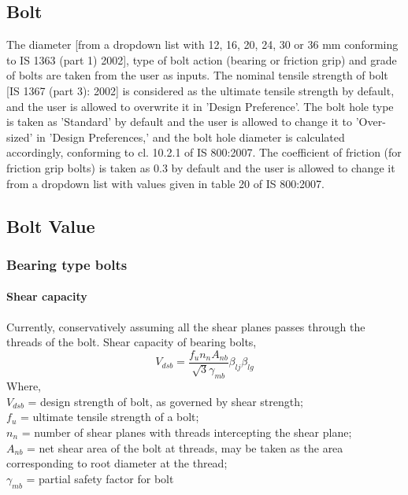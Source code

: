 \documentclass[11.5pt,a4paper,oneside]{report}
\begin{document}
\begin{Form}
\chapter{Bolt}
%
The diameter [from a dropdown list with 12, 16, 20, 24, 30 or 36 mm conforming to IS 1363 (part 1) 2002], type of bolt action (bearing or friction grip) and grade of bolts are taken from the user as inputs. The nominal tensile strength of bolt [IS 1367 (part 3): 2002] is considered as the ultimate tensile strength by default, and the user is allowed to overwrite it in 'Design Preference'. The bolt hole type is taken as 'Standard' by default and the user is allowed to change it to 'Over-sized' in 'Design Preferences,' and the bolt hole diameter is calculated accordingly, conforming to cl. 10.2.1 of IS 800:2007. The coefficient of friction (for friction grip bolts) is taken as 0.3 by default and the user is allowed to change it from a dropdown list with values given in table 20 of IS 800:2007. 
\section{Bolt Value}
\subsection{Bearing type bolts}
\subsubsection{Shear capacity}
Currently, conservatively assuming all the shear planes passes through the threads of the bolt. Shear capacity of bearing bolts,
\begin{equation}
	V_{dsb} = \frac{f_u n_n A_{nb}}{\sqrt{3} \gamma_{mb}} \beta_{lj} \beta_{lg} 
\end{equation}
Where, \\
\indent $V_{dsb}$ = design strength of bolt, as governed by shear strength;\\
\indent $f_u$ = ultimate tensile strength of a bolt;\\
\indent $n_n$ =  number of shear planes with threads intercepting the shear plane; \\
\indent $A_{nb}$ = net shear area of the bolt at threads, may be taken as the area corresponding to root diameter at the thread;\\
\indent $\gamma_{mb}$ = partial safety factor for bolt\\

\end{Form}
\end{document}
